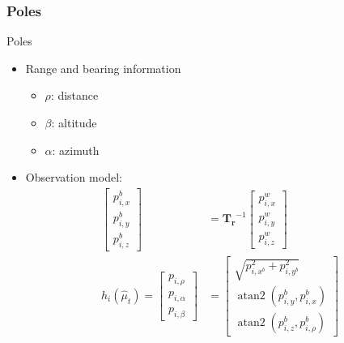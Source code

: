 \documentclass[serif]{beamer}
\newcommand{\atantwo}[2]{\operatorname{atan2}\left(#1, #2\right)}
\begin{document}
    \subsubsection{Poles}
    \begin{frame}[nonumber]{Poles}
        \begin{itemize}
            \item{Range and bearing information \begin{itemize}
                    \item{$\rho$: distance}
                    \item{$\beta$: altitude}
                    \item{$\alpha$: azimuth}
            \end{itemize}}
            \item{Observation model:
            \begin{align*}
                \begin{bmatrix}
                    p_{i, x}^b \\ p_{i, y}^b \\ p_{i, z}^b
                \end{bmatrix} &= \bm{T_r}^{-1} \begin{bmatrix}
                    p_{i, x}^w \\ p_{i, y}^w \\ p_{i, z}^w
                \end{bmatrix}\\
                h_i(\hat\mu_t) = \begin{bmatrix}
                    p_{i, \rho} \\ p_{i, \alpha} \\ p_{i, \beta}
                \end{bmatrix} &= \begin{bmatrix}
                    \sqrt{ p_{i, x^b}^2 + p_{i, y^b}^2 } \\
                    \atantwo{p_{i, y}^b}{p_{i, x}^b} \\
                    \atantwo{p_{i, z}^b}{p_{i,\rho}^b}
                \end{bmatrix}
            \end{align*}}
        \end{itemize}
    \end{frame}
\end{document}
